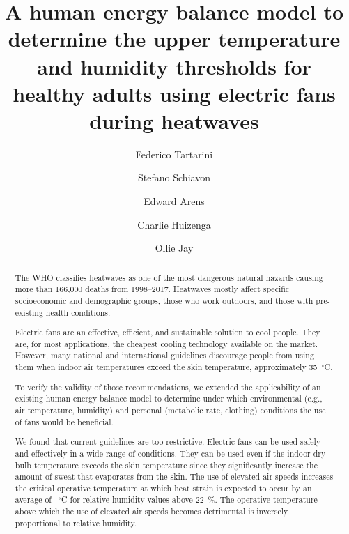 
\begin{frontmatter}

\title{A human energy balance model to determine the upper temperature and humidity thresholds for healthy adults using electric fans during heatwaves}


\author[sinBerBest]{Federico Tartarini}
\author[CBE]{Stefano Schiavon}
\author[CBE]{Edward Arens}
\author[CBE]{Charlie Huizenga}
 \author[USYD]{Ollie Jay}

\address[sinBerBest]{SinBerBEST, Berkeley Education Alliance for Research in Singapore, Singapore}
\address[CBE]{Center for the Built Environment, University of California, Berkeley, USA}
 \address[USYD]{Sydney School of Health Sciences, Faculty of Medicine and Health, The University of Sydney, Sydney, Australia}

\begin{abstract}
    The WHO classifies heatwaves as one of the most dangerous natural hazards causing more than 166,000 deaths from 1998--2017.
    Heatwaves mostly affect specific socioeconomic and demographic groups, those who work outdoors, and those with pre-existing health conditions.
    
    Electric fans are an effective, efficient, and sustainable solution to cool people.
    They are, for most applications, the cheapest cooling technology available on the market.
    However, many national and international guidelines discourage people from using them when indoor air temperatures exceed the skin temperature, approximately 35~$^{\circ}$C\@.
    
    To verify the validity of those recommendations, we extended the applicability of an existing human energy balance model to determine under which environmental (e.g., air temperature, humidity) and personal (metabolic rate, clothing) conditions the use of fans would be beneficial.
    
    We found that current guidelines are too restrictive.
    Electric fans can be used safely and effectively in a wide range of conditions.
    They can be used even if the indoor dry-bulb temperature exceeds the skin temperature since they significantly increase the amount of sweat that evaporates from the skin.
    The use of elevated air speeds increases the critical operative temperature at which heat strain is expected to occur by an average of ~$^{\circ}$C for relative humidity values above 22~\%\@.
    The operative temperature above which the use of elevated air speeds becomes detrimental is inversely proportional to relative humidity.
    

\end{abstract}
\end{frontmatter}
